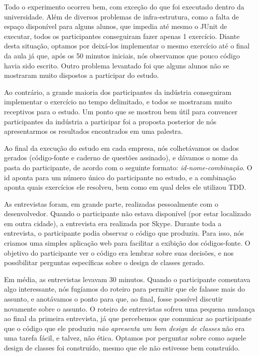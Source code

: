Todo o experimento ocorreu bem, com exceção do que foi executado
dentro da universidade. Além de diversos problemas de infra-estrutura,
como a falta de espaço disponível para alguns alunos, que impedia até mesmo
o JUnit de executar, todos os participantes conseguiram fazer apenas
1 exercício. Diante desta situação, optamos por deixá-los implementar
o mesmo exercício até o final da aula já que, após os 50 minutos iniciais,
nós observamos que pouco código havia sido escrito. Outro problema levantado
foi que alguns alunos não se mostraram muito dispostos a participar
do estudo.

Ao contrário, a grande maioria dos participantes da indústria conseguiram
implementar o exercício no tempo delimitado, e todos se mostraram
muito receptivos para o estudo. Um ponto que se mostrou bem útil
para convencer participantes da indústria a participar foi a proposta
posterior de nós apresentarmos os resultados encontrados em uma palestra.

Ao final da execução do estudo em cada empresa, nós colhetávamos
os dados gerados (código-fonte e caderno de questões assinado),
e dávamos o nome da pasta do participante, de acordo com
o seguinte formato: \textit{id-nome-combinação}. O id aponta
para um número único do participante no estudo, e a combinação
aponta quais exercícios ele resolveu, bem como em qual deles
ele utilizou TDD.

As entrevistas foram, em grande parte, realizadas pessoalmente com 
o desenvolvedor. Quando o participante não estava disponível (por estar
localizado em outra cidade), a entrevista era realizada por Skype.
Durante toda a entrevista, o participante podia observar o código que
produziu. Para isso, nós criamos uma simples aplicação web para facilitar
a exibição dos códigos-fonte. O objetivo do participante ver o código
era lembrar sobre suas decisões, e nos possibilitar perguntas específicas
sobre o design de classes gerado.

Em média, as entrevistas levavam 30 minutos. Quando o participante comentava
algo interessante, nós fugíamos do roteiro para permitir que ele falasse mais do assunto,
e anotávamos o ponto para que, ao final, fosse possível discutir novamente sobre o assunto.
O roteiro de entrevistas sofreu uma pequena mudança ao final da primeira entrevista,
já que percebemos que comunicar ao participante que o código que ele produziu
\textit{não apresenta um bom design de classes} não era uma tarefa fácil, e talvez, não ética. 
Optamos por perguntar sobre como aquele design de classes foi construído, mesmo que ele
não estivesse bem construído.

